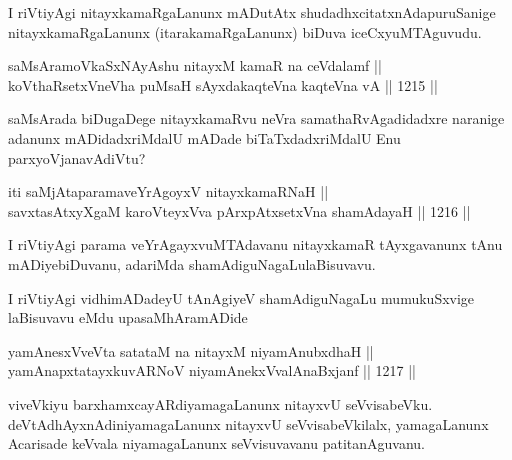 \begin{artha}
I riVtiyAgi nitayxkamaRgaLanunx mADutAtx shudadhxcitatxnAda\break puruSanige nitayxkamaRgaLanunx (itarakamaRgaLanunx) biDuva iceCxyuMTAguvudu.
\end{artha}


\begin{shl}
saMsAramoVkaSxNAyA\s \s shu nitayxM kamaR na ceVdalamf || \\
koV\s thaRsetxVneVha puMsaH sAyxdakaqteVna kaqteVna vA \hfill || 1215 ||  
\end{shl}

\begin{artha}
saMsArada biDugaDege nitayxkamaRvu neVra samathaRvAgadidadxre naranige adanunx mADidadxriMdalU mADade biTaTxdadxriMdalU Enu parxyoVjanavAdiVtu?
\end{artha}

\begin{shl}
iti saMjAtaparamaveYrAgoyxV nitayxkamaRNaH || \\
savxtasAtxyXgaM karoVteyxVva pArxpAtxsetxVna shamAdayaH \hfill || 1216 ||  
\end{shl}

\begin{artha}
I riVtiyAgi parama veYrAgayxvuMTAdavanu nitayxkamaR tAyxgavanunx tAnu mADiyebiDuvanu, adariMda shamAdiguNagaLu\break laBisuvavu.
\end{artha}

\begin{center}
I riVtiyAgi vidhimADadeyU tAnAgiyeV shamAdiguNagaLu mumukuSxvige laBisuvavu eMdu upasaMhAramADide
\end{center}


\begin{shl}
yamAnesxVveVta satataM na nitayxM niyamAnubxdhaH || \\
yamAnapxtatayxkuvARNoV niyamAnekxVvalAnaBxjanf \hfill || 1217 ||  
\end{shl}

\begin{artha}
viveVkiyu barxhamxcayARdiyamagaLanunx nitayxvU seVvisabeVku. deVtAdhAyxnAdiniyamagaLanunx nitayxvU seVvisabeVkilalx, yamagaLanunx Acarisade keVvala niyamagaLanunx seVvisuvavanu patitanAguvanu.
\end{artha}


